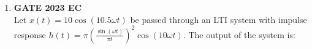 \documentclass{article}
\begin{document}
\begin{enumerate}
    
    \item \textbf{GATE 2023 EC}\\
          Let \(x(t) = 10 \cos(10.5 \omega t)\) be passed through an LTI system with impulse response \(h(t) = \pi\left(\frac{\sin(\omega t)}{\pi t}\right)^2 \cos(10 \omega t)\). The output of the system is:
  \end{enumerate}
  
\end{document}
